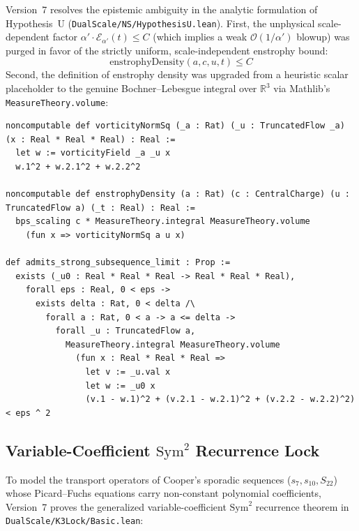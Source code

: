 \documentclass[11pt,a4paper]{article}
\theoremstyle{plain}
\theoremstyle{definition}
\theoremstyle{remark}
\begin{document}
Version~7 resolves the epistemic ambiguity in the analytic formulation of Hypothesis~U (\texttt{DualScale/NS/HypothesisU.lean}). First, the unphysical scale-dependent factor $\alpha' \cdot \mathcal{E}_{\alpha'}(t) \le C$ (which implies a weak $\mathcal{O}(1/\alpha')$ blowup) was purged in favor of the strictly uniform, scale-independent enstrophy bound:
\[
  \text{enstrophyDensity}(a, c, u, t) \le C
\]
Second, the definition of enstrophy density was upgraded from a heuristic scalar placeholder to the genuine Bochner--Lebesgue integral over $\mathbb{R}^3$ via Mathlib's \texttt{MeasureTheory.volume}:

\begin{lstlisting}[caption={Measure-theoretic enstrophy density and L2 convergence (VERIFIED).}]
noncomputable def vorticityNormSq (_a : Rat) (_u : TruncatedFlow _a) (x : Real * Real * Real) : Real :=
  let w := vorticityField _a _u x
  w.1^2 + w.2.1^2 + w.2.2^2

noncomputable def enstrophyDensity (a : Rat) (c : CentralCharge) (u : TruncatedFlow a) (_t : Real) : Real :=
  bps_scaling c * MeasureTheory.integral MeasureTheory.volume
    (fun x => vorticityNormSq a u x)

def admits_strong_subsequence_limit : Prop :=
  exists (_u0 : Real * Real * Real -> Real * Real * Real),
    forall eps : Real, 0 < eps ->
      exists delta : Rat, 0 < delta /\
        forall a : Rat, 0 < a -> a <= delta ->
          forall _u : TruncatedFlow a,
            MeasureTheory.integral MeasureTheory.volume
              (fun x : Real * Real * Real =>
                let v := _u.val x
                let w := _u0 x
                (v.1 - w.1)^2 + (v.2.1 - w.2.1)^2 + (v.2.2 - w.2.2)^2) < eps ^ 2
\end{lstlisting}

\subsection{Variable-Coefficient $\mathrm{Sym}^2$ Recurrence Lock}

To model the transport operators of Cooper's sporadic sequences ($s_7, s_{10}, S_{22}$) whose Picard--Fuchs equations carry non-constant polynomial coefficients, Version~7 proves the generalized variable-coefficient $\mathrm{Sym}^2$ recurrence theorem in \texttt{DualScale/K3Lock/Basic.lean}:
\end{document}
